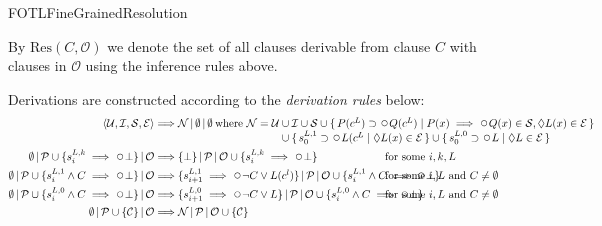 \begin{entry}{FOTLFineGrainedResolution}
\begin{calculus}
\begin{small}
By $\mathrm{Res}(C,\mathcal{O})$ we denote the set of all clauses
derivable from clause $C$ with clauses in $\mathcal{O}$ using the
inference rules above.

Derivations are constructed according to the \emph{derivation rules}
below:\vspace*{-2ex}
\begin{align*}
\langle \mathcal{U}, \mathcal{I}, \mathcal{S}, \mathcal{E} \rangle
&\Longrightarrow
\ProverState{\mathcal{N}}{\emptyset}{\emptyset}
\parbox[t]{25em}{\ 
\begin{tabular}[t]{@{}l@{}}
where
$\mathcal{N} = \mathcal{U}
\begin{array}[t]{@{}l@{}}
\hbox{}\cup \mathcal{I} \cup \mathcal{S} \cup \Set{P(c^L) \supset \Next Q(c^L)}{P(x) \implies \Next Q(x) \in
  \mathcal{S}, \Eventually L(x)\in\mathcal{E}}\\
\hbox{}\cup \Set{s^{L,1}_0 \supset \Next L(c^L}{\Eventually L(x) \in
  \mathcal{E}}
\cup \Set{s^{L,0}_0 \supset \Next L}{\Eventually L \in
  \mathcal{E}}
\end{array}
$
\end{tabular}}
\\
\ProverState{\emptyset}{\ProcessedSet \cup 
\SetEnum{s^{L,k}_i \implies \Next\EmptyClause}}{\OldSet}
&\Longrightarrow
\makebox[187pt][l]{$\ProverState{\SetEnum{\EmptyClause}}{\ProcessedSet}{\OldSet \cup 
\SetEnum{s^{L,k}_i \implies \Next \EmptyClause}}$}
\mbox{ for some $i, k, L$}
\\
\ProverState{\emptyset}{\ProcessedSet \cup 
\SetEnum{s^{L,1}_i \land C \implies \Next\EmptyClause}}{\OldSet}
&\Longrightarrow
\makebox[187pt][l]{\ProverState{\SetEnum{s^{L,1}_{i+1} \implies \Next \lnot C \lor
L(c^l)}}{\ProcessedSet}{\OldSet \cup 
\SetEnum{s^{L,1}_i \land C \implies\Next\EmptyClause}}}
\mbox{ for some $i,L$ and $C \neq \emptyset$}\makebox[12pt][l]{}
\\
\ProverState{\emptyset}{\ProcessedSet \cup 
\SetEnum{s^{L,0}_i \land C \implies \Next\EmptyClause}}{\OldSet}
&\Longrightarrow
\makebox[187pt][l]{$\ProverState{\SetEnum{s^{L,0}_{i+1} \implies \Next \lnot C \lor
L}}{\ProcessedSet}{\OldSet \cup 
\SetEnum{s^{L,0}_i \land C \implies\Next\EmptyClause}}$}
\mbox{ for some $i,L$ and $C \neq \emptyset$}
\\
\ProverState{\emptyset}{\ProcessedSet \cup \SetEnum{\mathcal{C}}}{\OldSet}
&\Longrightarrow
\makebox[56pt][l]{$\ProverState{\NewSet}{\ProcessedSet}{\OldSet \cup \SetEnum{\mathcal{C}}}$}

\end{align*}
\end{small}
\end{calculus}
\end{entry}
